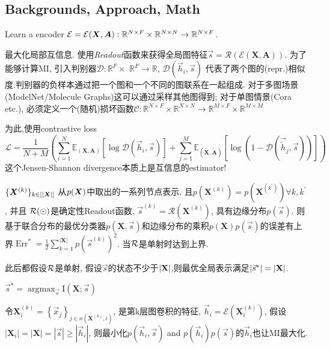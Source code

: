 \documentclass{article}
\begin{document}
\subsection{Backgrounds, Approach, Math}
     Learn a encoder $\mathcal{E}=\cal {E}(\bs X, \bs A): \mathbb{R}^{N \times F} \times \mathbb{R}^{N \times N} \rightarrow \mathbb{R}^{N \times F}$.

     最大化局部互信息. 使用\textit{Readout}函数来获得全局图特征$\vec{s}=\mathcal{R}(\mathcal{E}(\mathbf{X}, \mathbf{A}))$. 为了能够计算MI, 引入判别器$\mathcal{D}: \mathbb{R}^{F} \times$ $\mathbb{R}^{F} \rightarrow \mathbb{R}$, $\mathcal{D}\left(\vec{h}_{i}, \vec{s}\right)$ 代表了两个图的(repr.)相似度.判别器的负样本通过把一个图和一个不同的图联系在一起组成. 对于多图场景(ModelNet/Molecule Graphs)这可以通过采样其他图得到; 对于单图情景(Cora etc.), 必须定义一个(随机)损坏函数$\mathcal{C}: \mathbb{R}^{N \times F} \times \mathbb{R}^{N \times N} \rightarrow \mathbb{R}^{M \times F} \times \mathbb{R}^{M \times M}$

    为此,使用contrastive loss
    \begin{equation}
        \mathcal{L}=\frac{1}{N+M}\left(\sum_{i=1}^{N} \mathbb{E}_{(\mathbf{X}, \mathbf{A})}\left[\log \mathcal{D}\left(\vec{h}_{i}, \vec{s}\right)\right]+\sum_{j=1}^{M} \mathbb{E}_{(\tilde{\mathbf{X}}, \widetilde{\mathbf{A}})}\left[\log \left(1-\mathcal{D}\left(\overrightarrow{\tilde{h}}_{j}, \vec{s}\right)\right)\right]\right)
        \label{dgiloss}
    \end{equation}
    这个Jensen-Shannon divergence本质上是互信息的estimator!

     $\{\bs X^{(k)}\}_{k\in[|\bs X|]}$ 从$p(\bs X)$中取出的一系列节点表示, 且$p\left(\mathbf{X}^{(k)}\right)=p\left(\mathbf{X}^{\left(k^{\prime}\right)}\right) \forall k, k^{\prime}$, 并且 $\cal R(\odot)$是确定性Readout函数, $\vec{s}^{(k)}=\mathcal{R}\left(\mathbf{X}^{(k)}\right)$, 具有边缘分布$p(\vec s)$. 则基于联合分布的最优分类器$p(\mathbf{X}, \vec{s})$和边缘分布的乘积$p(\mathbf{X}) p(\vec{s})$的误差有上界$\operatorname{Err}^{*}=\frac{1}{2} \sum_{k=1}^{|\mathbf{X}|} p\left(\vec{s}^{(k)}\right)^{2}$. 当$\cal R$是单射时达到上界.

     此后都假设$\cal R$是单射, 假设$\vec s$的状态不少于$|\bt X|$,则最优全局表示满足$|\vec s^*|=|\bt X|$.

     $\vec{s}^{\star}=\operatorname{argmax}_{\vec{s}} \mathrm{I}(\mathbf{X} ; \vec{s})$

     令$\mathbf{X}_{i}^{(k)}=\left\{\vec{x}_{j}\right\}_{j \in n\left(\mathbf{X}^{(k)}, i\right)}$, 是第k层图卷积的特征, $\vec{h}_{i}=\mathcal{E}\left(\mathbf{X}_{i}^{(k)}\right)$, 假设$\left|\mathbf{X}_{i}\right|=|\mathbf{X}|=|\vec{s}| \geq\left|\vec{h}_{i}\right|$, 则最小化$p\left(\vec{h}_{i}, \vec{s}\right)$ and $p\left(\vec{h}_{i}\right) p(\vec{s})$的$\vec h_i$也让MI最大化.
\end{document}
